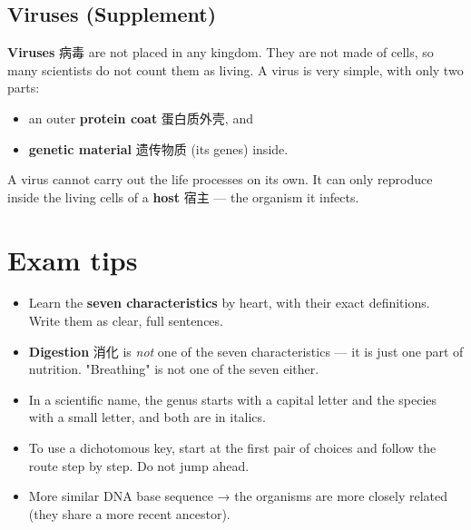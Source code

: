 \documentclass[11pt]{article}
\begin{document}
\subsection*{Viruses (Supplement)}

\textbf{Viruses} 病毒 are not placed in any kingdom. They are not made of cells, so many scientists do not count them as living. A virus is very simple, with only two parts:

\begin{itemize}
\item an outer \textbf{protein coat} 蛋白质外壳, and

\item \textbf{genetic material} 遗传物质 (its genes) inside.

\end{itemize}

A virus cannot carry out the life processes on its own. It can only reproduce inside the living cells of a \textbf{host} 宿主 — the organism it infects.

\section*{Exam tips}

\begin{itemize}
\item Learn the \textbf{seven characteristics} by heart, with their exact definitions. Write them as clear, full sentences.

\item \textbf{Digestion} 消化 is \emph{not} one of the seven characteristics — it is just one part of nutrition. "Breathing" is not one of the seven either.

\item In a scientific name, the genus starts with a capital letter and the species with a small letter, and both are in italics.

\item To use a dichotomous key, start at the first pair of choices and follow the route step by step. Do not jump ahead.

\item More similar DNA base sequence → the organisms are more closely related (they share a more recent ancestor).

\end{itemize}
\end{document}
